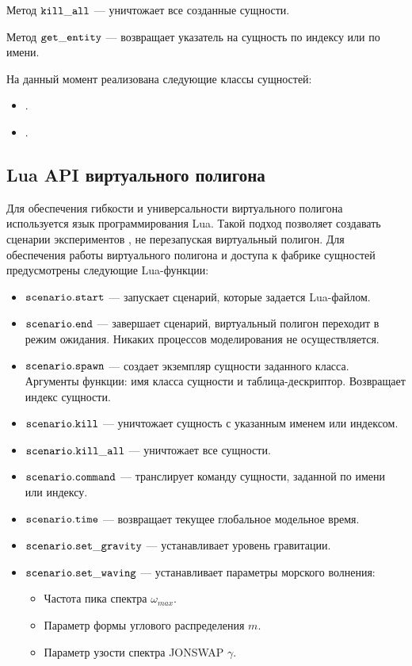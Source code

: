 Метод $\tt kill\_all$ --- уничтожает все созданные сущности.

Метод $\tt get\_entity$ --- возвращает указатель на сущность по индексу или по имени.

На данный момент реализована следующие классы сущностей:
\begin{itemize}
	\item 	{}.
	\item	{}.
\end{itemize}

%

\subsection{Lua API виртуального полигона}

Для обеспечения гибкости и универсальности виртуального полигона используется язык программирования Lua.
Такой подход позволяет создавать сценарии экспериментов , не перезапуская виртуальный полигон.
Для обеспечения работы виртуального полигона и доступа к фабрике сущностей предусмотрены следующие Lua-функции:

\begin{itemize}
	\item $\tt scenario.start$ --- запускает сценарий, которые задается Lua-файлом.
	\item $\tt scenario.end$ --- завершает сценарий, виртуальный полигон переходит в 
	режим ожидания. Никаких процессов моделирования не осуществляется.
	\item $\tt scenario.spawn$ --- создает экземпляр сущности заданного класса. Аргументы функции: имя класса сущности и таблица-дескриптор. Возвращает индекс сущности.
	\item $\tt scenario.kill$ --- уничтожает сущность с указанным именем или индексом.
	\item $\tt scenario.kill\_all$ --- уничтожает все сущности.
	\item $\tt scenario.command$ --- транслирует команду сущности, заданной по имени или индексу.
	\item $\tt scenario.time$ --- возвращает текущее глобальное модельное время.
	\item $\tt scenario.set\_gravity$ --- устанавливает уровень гравитации.
	\item $\tt scenario.set\_waving$ --- устанавливает параметры морского волнения:
		\begin{itemize}
		\item Частота пика спектра $\omega_{max}$.
		\item Параметр формы углового распределения $m$.
		\item Параметр узости спектра JONSWAP $\gamma$.
		\end{itemize}
\end{itemize}


